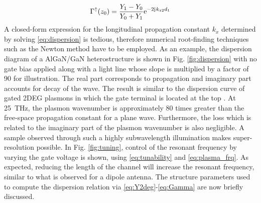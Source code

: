 %
\begin{equation}
  \Gamma^{\uparrow}(z_0) = \frac{Y_1 - Y_0}{Y_0 + Y_1} \mathrm{e}^{-2\mathrm{j}\mkern1mu k_{z2}d_1}
  \label{eq:Gamma}
\end{equation}
%
A closed-form expression for the longitudinal propagation constant $k_x$ determined by solving \eqref{eq:dispersion} is tedious, therefore numerical root-finding techniques such as the Newton method \cite{Press2007} have to be employed. As an example, the dispersion diagram of a AlGaN/GaN heterostructure is shown in Fig. \ref{fig:dispersion} with no gate bias applied along with a light line whose slope is multiplied by a factor of 90 for illustration. The real part corresponds to propagation and imaginary part accounts for decay of the wave. The result is similar to the dispersion curve of gated 2DEG plasmons in which the gate terminal is located at the top \cite{Nakayama1974, Eguiluz1975}. At \SI{25}{\THz}, the plasmon wavenumber is approximately 80 times greater than the free-space propagation constant for a plane wave. Furthermore, the loss which is related to the imaginary part of the plasmon wavenumber is also negligible. A sample observed through such a highly subwavelength illumination makes
super-resolution possible. In Fig. \ref{fig:tuning}, control of the resonant frequency by varying the gate voltage is shown, using \eqref{eq:tunability} and \eqref{eq:plasma_frq}. As expected, reducing the length of the channel will increase the resonant frequency, similar to what is observed for a dipole antenna. The structure parameters used to compute the
dispersion relation via \eqref{eq:Y2deg}-\eqref{eq:Gamma} are now briefly discussed.

